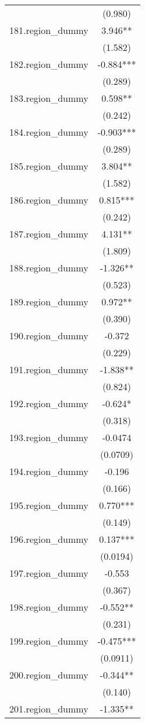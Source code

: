 \documentclass[]{article}
\begin{document}
\begin{tabular}{lc}
 & (0.980) \\
181.region\_dummy & 3.946** \\
 & (1.582) \\
182.region\_dummy & -0.884*** \\
 & (0.289) \\
183.region\_dummy & 0.598** \\
 & (0.242) \\
184.region\_dummy & -0.903*** \\
 & (0.289) \\
185.region\_dummy & 3.804** \\
 & (1.582) \\
186.region\_dummy & 0.815*** \\
 & (0.242) \\
187.region\_dummy & 4.131** \\
 & (1.809) \\
188.region\_dummy & -1.326** \\
 & (0.523) \\
189.region\_dummy & 0.972** \\
 & (0.390) \\
190.region\_dummy & -0.372 \\
 & (0.229) \\
191.region\_dummy & -1.838** \\
 & (0.824) \\
192.region\_dummy & -0.624* \\
 & (0.318) \\
193.region\_dummy & -0.0474 \\
 & (0.0709) \\
194.region\_dummy & -0.196 \\
 & (0.166) \\
195.region\_dummy & 0.770*** \\
 & (0.149) \\
196.region\_dummy & 0.137*** \\
 & (0.0194) \\
197.region\_dummy & -0.553 \\
 & (0.367) \\
198.region\_dummy & -0.552** \\
 & (0.231) \\
199.region\_dummy & -0.475*** \\
 & (0.0911) \\
200.region\_dummy & -0.344** \\
 & (0.140) \\
201.region\_dummy & -1.335** \\

\end{tabular}
\end{document}
